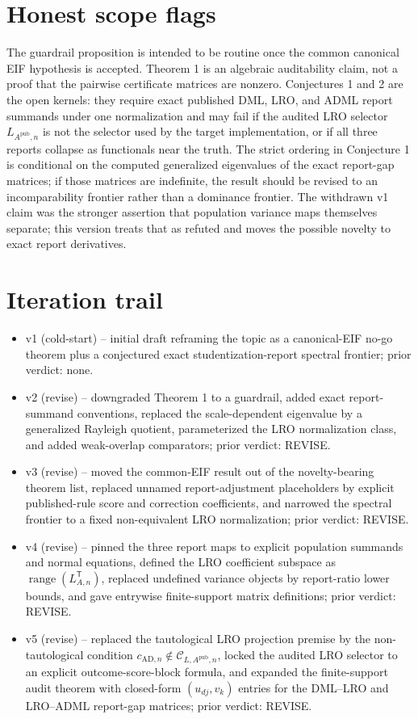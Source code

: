 \documentclass[11pt]{article}
\newcommand{\transpose}{\mathsf{T}}
\theoremstyle{definition}
\theoremstyle{plain}
\theoremstyle{remark}
\begin{document}
\section{Honest scope flags}
The guardrail proposition is intended to be routine once the common canonical
EIF hypothesis is accepted.  Theorem 1 is an algebraic auditability claim, not a proof that
the pairwise certificate matrices are nonzero.  Conjectures 1 and 2 are the
open kernels: they require exact published DML, LRO, and ADML report summands
under one normalization and may fail if the audited LRO selector
\(L_{A^{\mathrm{pub}},n}\) is not the selector used by the target
implementation, or if all three reports collapse as functionals near the
truth.  The strict ordering in Conjecture 1 is conditional on the
computed generalized eigenvalues of the exact report-gap matrices; if those
matrices are indefinite, the result should be revised to an incomparability
frontier rather than a dominance frontier.  The withdrawn v1 claim was the
stronger assertion that population variance maps themselves separate; this
version treats that as refuted and moves the possible novelty to exact report
derivatives.

\section{Iteration trail}
\begin{itemize}[leftmargin=*]
\item v1 (cold-start) -- initial draft reframing the topic as a canonical-EIF
no-go theorem plus a conjectured exact studentization-report spectral
frontier; prior verdict: none.
\item v2 (revise) -- downgraded Theorem 1 to a guardrail, added exact
report-summand conventions, replaced the scale-dependent eigenvalue by a
generalized Rayleigh quotient, parameterized the LRO normalization class, and
added weak-overlap comparators; prior verdict: REVISE.
\item v3 (revise) -- moved the common-EIF result out of the novelty-bearing
theorem list, replaced unnamed report-adjustment placeholders by explicit
published-rule score and correction coefficients, and narrowed the spectral
frontier to a fixed non-equivalent LRO normalization; prior verdict: REVISE.
\item v4 (revise) -- pinned the three report maps to explicit population
summands and normal equations, defined the LRO coefficient subspace as
\(\operatorname{range}(L_{A,n}^{\transpose})\), replaced undefined variance
objects by report-ratio lower bounds, and gave entrywise finite-support matrix
definitions; prior verdict: REVISE.
\item v5 (revise) -- replaced the tautological LRO projection premise by the
non-tautological condition \(c_{\mathrm{AD},n}\notin\mathcal C_{L,A^{\mathrm{pub}},n}\),
locked the audited LRO selector to an explicit outcome-score-block formula,
and expanded the finite-support audit theorem with closed-form
\((u_{dj},v_k)\) entries for the DML--LRO and LRO--ADML report-gap matrices;
prior verdict: REVISE.
\end{itemize}
\end{document}
